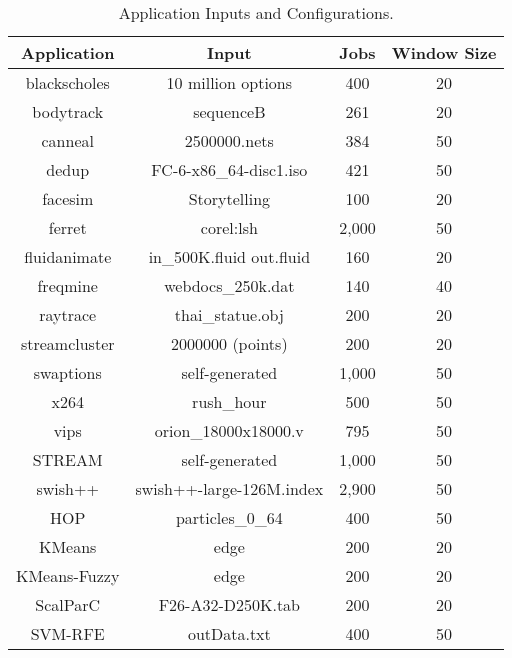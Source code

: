 \begin{table}[t]
\scriptsize
\centering
\caption{Application Inputs and Configurations.}
\begin{tabular}{cccc}
  \textbf{Application} & \textbf{Input} & \textbf{Jobs} & \textbf{Window Size} \\
  \hline
  \hline
  blackscholes    & 10 million options             & 400      & 20 \\
  bodytrack       & sequenceB                      & 261      & 20 \\
  canneal         & 2500000.nets                   & 384      & 50 \\
  dedup           & FC-6-x86\_64-disc1.iso         & 421      & 50 \\
  facesim         & Storytelling                   & 100      & 20 \\
  ferret          & corel:lsh                      & 2,000    & 50 \\
  fluidanimate    & in\_500K.fluid out.fluid       & 160      & 20 \\
  freqmine        & webdocs\_250k.dat              & 140      & 40 \\
  raytrace        & thai\_statue.obj               & 200      & 20 \\
  streamcluster   & 2000000 (points)               & 200      & 20 \\
  swaptions       & self-generated                 & 1,000    & 50 \\
  x264            & rush\_hour                     & 500      & 50 \\
  vips            & orion\_18000x18000.v           & 795      & 50 \\
  STREAM          & self-generated                 & 1,000    & 50 \\
  swish++         & swish++-large-126M.index       & 2,900    & 50 \\
  HOP             & particles\_0\_64               & 400      & 50 \\
  KMeans          & edge                           & 200      & 20 \\
  KMeans-Fuzzy    & edge                           & 200      & 20 \\
  ScalParC        & F26-A32-D250K.tab              & 200      & 20 \\
  SVM-RFE         & outData.txt                    & 400      & 50 \\
  \hline
  \hline
\end{tabular}
\label{tbl:inputs}
\end{table}

